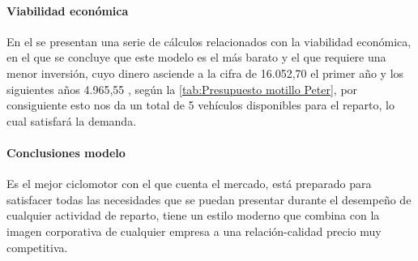 \paragraph{Viabilidad económica}

En el  se presentan una serie de cálculos relacionados con la viabilidad económica, en el que se concluye que este modelo es el más barato y el que requiere una menor inversión, cuyo dinero asciende a la cifra de 16.052,70  el primer año y los siguientes años 4.965,55 , según la \autoref{tab:Presupuesto motillo Peter}, por consiguiente esto nos da un total de 5 vehículos disponibles para el reparto, lo cual satisfará la demanda.

\paragraph{Conclusiones modelo}
Es el mejor ciclomotor con el que cuenta el mercado, está preparado para satisfacer todas las necesidades que se puedan presentar durante el desempeño de cualquier actividad de reparto, tiene un estilo moderno que combina con la imagen corporativa de cualquier empresa a una relación-calidad precio muy competitiva.